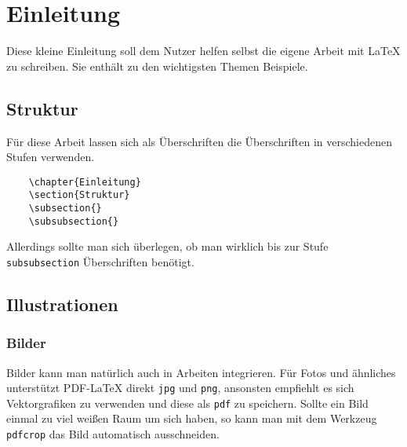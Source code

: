 \chapter{Einleitung}

Diese kleine Einleitung soll dem Nutzer helfen selbst die eigene Arbeit mit \LaTeX{} zu schreiben. Sie enthält zu den wichtigsten Themen Beispiele.


\section{Struktur}

Für diese Arbeit lassen sich als Überschriften die Überschriften in verschiedenen Stufen verwenden.

\begin{verbatim}
    \chapter{Einleitung}
    \section{Struktur}
    \subsection{}
    \subsubsection{}
\end{verbatim}

Allerdings sollte man sich überlegen, ob man wirklich bis zur Stufe \verb|subsubsection| Überschriften benötigt.



\section{Illustrationen}


\subsection{Bilder}

Bilder kann man natürlich auch in Arbeiten integrieren. Für Fotos und ähnliches unterstützt PDF-\LaTeX{} direkt \verb|jpg| und \verb|png|, ansonsten empfiehlt es sich Vektorgrafiken zu verwenden und diese als \verb|pdf| zu speichern. Sollte ein Bild einmal zu viel weißen Raum um sich haben, so kann man mit dem Werkzeug \verb|pdfcrop| das Bild automatisch ausschneiden\cite{pdfcrop}.

